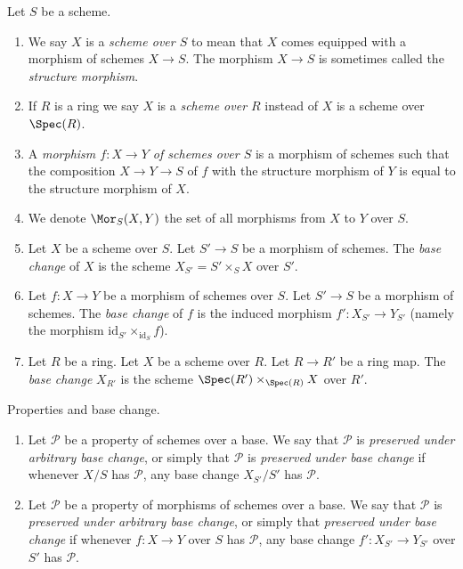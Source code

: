 \begin{definition}
\label{definition-base-change}
Let $S$ be a scheme.
\begin{enumerate}
\item We say $X$ is a {\it scheme over $S$} to mean that $X$
comes equipped with a morphism of schemes $X \to S$.
The morphism $X \to S$ is sometimes called the
{\it structure morphism}.
\item If $R$ is a ring we say
$X$ is a {\it scheme over $R$} instead of
$X$ is a scheme over $\Spec(R)$.
\item A {\it morphism $f : X \to Y$ of schemes over $S$}
is a morphism of schemes such that the composition
$X \to Y \to S$ of $f$ with the structure morphism of $Y$ is
equal to the structure morphism of $X$.
\item We denote $\Mor_S(X, Y)$ the set of all morphisms
from $X$ to $Y$ over $S$.
\item Let $X$ be a scheme over $S$. Let $S' \to S$ be a
morphism of schemes. The {\it base change} of $X$
is the scheme $X_{S'} = S' \times_S X$ over $S'$.
\item Let $f : X \to Y$ be a morphism of schemes over $S$. Let $S' \to S$
be a morphism of schemes. The {\it base change} of $f$ is
the induced morphism $f' : X_{S'} \to Y_{S'}$ (namely the
morphism $\text{id}_{S'} \times_{\text{id}_S} f$).
\item Let $R$ be a ring. Let $X$ be a scheme over $R$.
Let $R \to R'$ be a ring map. The {\it base change} $X_{R'}$
is the scheme $\Spec(R') \times_{\Spec(R)} X$
over $R'$.
\end{enumerate}
\end{definition}

\begin{definition}
\label{definition-preserved-by-base-change}
Properties and base change.
\begin{enumerate}
\item Let $\mathcal{P}$ be a property of schemes over a base.
We say that $\mathcal{P}$ is {\it preserved under arbitrary base change},
or simply that $\mathcal{P}$ is {\it preserved under base change}
if whenever $X/S$
has $\mathcal{P}$, any base change $X_{S'}/S'$ has $\mathcal{P}$.
\item Let $\mathcal{P}$ be a property of morphisms of schemes over a base.
We say that $\mathcal{P}$ is {\it preserved under arbitrary base change},
or simply that {\it preserved under base change} if whenever
$f : X \to Y$ over $S$ has $\mathcal{P}$, any base change
$f' : X_{S'} \to Y_{S'}$ over $S'$ has $\mathcal{P}$.
\end{enumerate}
\end{definition}

